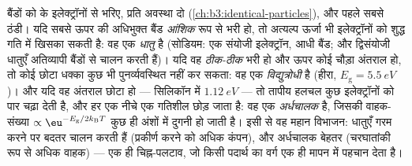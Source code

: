 \begin{definition}[धातु, विद्युत्रोधी, अर्धचालक]\label{def:b3:electrons-in-solids:classes}
बैंडों को  के इलेक्ट्रॉनों से भरिए, प्रति अवस्था दो
(\cref{ch:b3:identical-particles}), और पहले सबसे ठंडी। यदि सबसे ऊपर
की अधिभुक्त बैंड \emph{आंशिक} रूप से भरी हो, तो अत्यल्प ऊर्जा भी
इलेक्ट्रॉनों को शुद्ध गति में खिसका सकती है: वह एक \emph{धातु} है
(सोडियम: एक संयोजी इलेक्ट्रॉन, आधी बैंड; और द्विसंयोजी धातुएँ
अतिव्यापी बैंडों से चालन करती हैं)। यदि वह \emph{ठीक-ठीक} भरी हो और
ऊपर कोई चौड़ा अंतराल हो, तो कोई छोटा धक्का कुछ भी पुनर्व्यवस्थित नहीं
कर सकता: वह एक \emph{विद्युत्रोधी} है
(हीरा, $E_{\text{g}} = \qty{5.5}{eV}$)। और यदि वह अंतराल छोटा हो ---
सिलिकॉन में $\qty{1.12}{eV}$ --- तो तापीय हलचल कुछ इलेक्ट्रॉनों को
पार चढ़ा देती है, और हर एक नीचे एक गतिशील \emph{} छोड़ जाता है: वह
एक \emph{अर्धचालक} है, जिसकी वाहक-संख्या
$\propto\eu^{-E_{\text{g}}/2k_{\text{B}}T}$ कुछ ही अंशों में दुगनी हो
जाती है। इसी से वह महान विभाजन: धातुएँ गरम करने पर बदतर चालन करती हैं
(प्रकीर्ण करने को अधिक कंपन), और अर्धचालक बेहतर
(चरघातांकी रूप से अधिक वाहक) --- एक ही चिह्न-पलटाव, जो किसी पदार्थ का
वर्ग एक ही मापन में पहचान देता है।
\end{definition}

